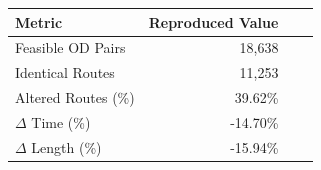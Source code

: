 \begin{tabular}{lrrr}
\hline
Metric & Reproduced Value \\
\hline
Feasible OD Pairs & 18,638 \\
Identical Routes & 11,253 \\
Altered Routes (\%) & 39.62\% \\
$\Delta$ Time (\%) & -14.70\% \\
$\Delta$ Length (\%) & -15.94\% \\
\hline
\end{tabular}
